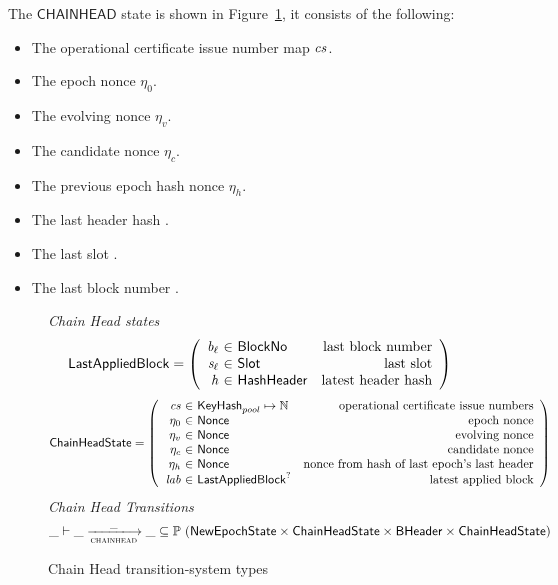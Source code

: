 The $\mathsf{CHAINHEAD}$ state is shown in Figure~\ref{fig:ts-types:chainhead}, it consists of the
following:

\begin{itemize}
  \item The operational certificate issue number map $\mathit{cs}$.
  \item The epoch nonce $\eta_0$.
  \item The evolving nonce $\eta_v$.
  \item The candidate nonce $\eta_c$.
  \item The previous epoch hash nonce $\eta_h$.
  \item The last header hash .
  \item The last slot .
  \item The last block number .
\end{itemize}

\begin{figure}
  \emph{Chain Head states}
  \begin{equation*}
    \LastAppliedBlock =
    \left(
      \begin{array}{r@{~\in~}lr}
        \var{b_\ell} & \BlockNo & \text{last block number} \\
        \var{s_\ell} & \Slot & \text{last slot} \\
        \var{h} & \HashHeader & \text{latest header hash} \\
      \end{array}
    \right)
  \end{equation*}
  \begin{equation*}
    \ChainHeadState =
    \left(
      \begin{array}{r@{~\in~}lr}
        \var{cs} & \KeyHash_{pool} \mapsto \N & \text{operational certificate issue numbers} \\
        ~\eta_0 & \Nonce & \text{epoch nonce} \\
        ~\eta_v & \Nonce & \text{evolving nonce} \\
        ~\eta_c & \Nonce & \text{candidate nonce} \\
        ~\eta_h & \Nonce & \text{nonce from hash of last epoch's last header} \\
        \var{lab} & \LastAppliedBlock^? & \text{latest applied block} \\
      \end{array}
    \right)
  \end{equation*}
  \emph{Chain Head Transitions}
  \begin{equation*}
    \_ \vdash \var{\_} \trans{chainhead}{\_} \var{\_} \subseteq
    \powerset (\NewEpochState \times \ChainHeadState \times \BHeader \times \ChainHeadState)
  \end{equation*}
  \caption{Chain Head transition-system types}
  \label{fig:ts-types:chainhead}
\end{figure}

